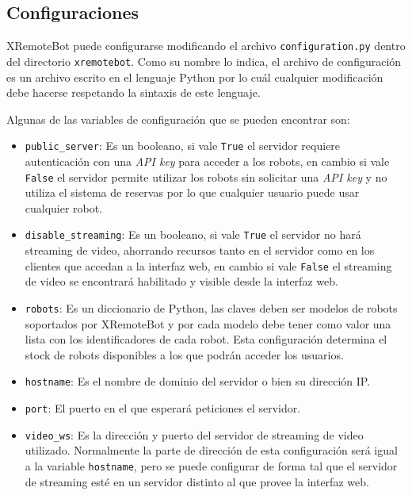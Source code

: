 \subsection{Configuraciones}\label{sec:configuraciones}

XRemoteBot puede configurarse modificando el archivo \texttt{configuration.py}
dentro del directorio \texttt{xremotebot}.
Como su nombre lo indica,
el archivo de configuración  es un archivo escrito en el lenguaje
Python por lo cuál cualquier modificación debe hacerse respetando
la sintaxis de este lenguaje.

Algunas de las variables de configuración que se pueden encontrar son:
\begin{itemize}
    \item \texttt{public\_server}: Es un booleano, si vale \texttt{True}
        el servidor requiere autenticación con una \textit{API key} para
        acceder a los robots, en cambio si vale \texttt{False} el servidor
        permite utilizar los robots sin solicitar una \textit{API key} y
        no utiliza el sistema de reservas por lo que cualquier usuario
        puede usar cualquier robot.
    \item \texttt{disable\_streaming}: Es un booleano, si vale \texttt{True}
        el servidor no hará streaming de video, ahorrando recursos tanto
        en el servidor como en los clientes que accedan a la interfaz web,
        en cambio si vale
        \texttt{False} el streaming de video se encontrará habilitado
        y visible desde la interfaz web.
    \item \texttt{robots}: Es un diccionario de Python, las claves
        deben ser modelos de robots soportados por XRemoteBot y por
        cada modelo debe tener como valor una lista con los identificadores
        de cada robot. Esta configuración determina el stock de robots
        disponibles a los que podrán acceder los usuarios.
    \item \texttt{hostname}: Es el nombre de dominio del servidor o bien
        su dirección IP.
    \item \texttt{port}: El puerto en el que esperará peticiones el
        servidor.
    \item \texttt{video\_ws}: Es la dirección y puerto del servidor de
        streaming de video utilizado. Normalmente la parte de
        dirección de esta configuración será igual a la variable
        \texttt{hostname}, pero se puede configurar de forma tal
        que el servidor de streaming esté en un servidor distinto
        al que provee la interfaz web.

\end{itemize}
